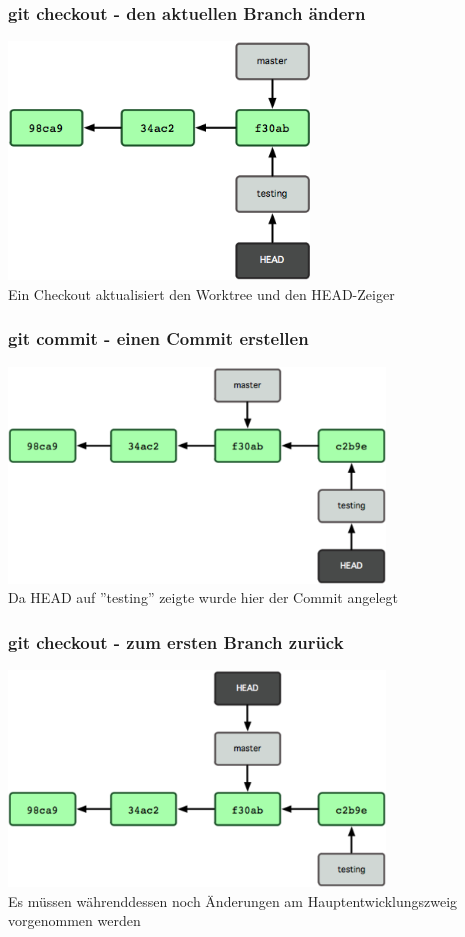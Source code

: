 \begin{frame}
  \frametitle{git checkout - den aktuellen Branch ändern}
  \begin{center}
    \includegraphics[width=8cm]{img/headref_changed.png} \\
    Ein Checkout aktualisiert den Worktree und den HEAD-Zeiger
  \end{center}
\end{frame}

\begin{frame}
  \frametitle{git commit - einen Commit erstellen}
  \begin{center}
    \includegraphics[width=10cm]{img/new_commit.png} \\
    Da HEAD auf ''testing'' zeigte wurde hier der Commit angelegt
  \end{center}
\end{frame}

\begin{frame}
  \frametitle{git checkout - zum ersten Branch zurück}
  \begin{center}
    \includegraphics[width=10cm]{img/checkout.png} \\
    Es müssen währenddessen noch Änderungen am Hauptentwicklungszweig vorgenommen werden
  \end{center}
\end{frame}

